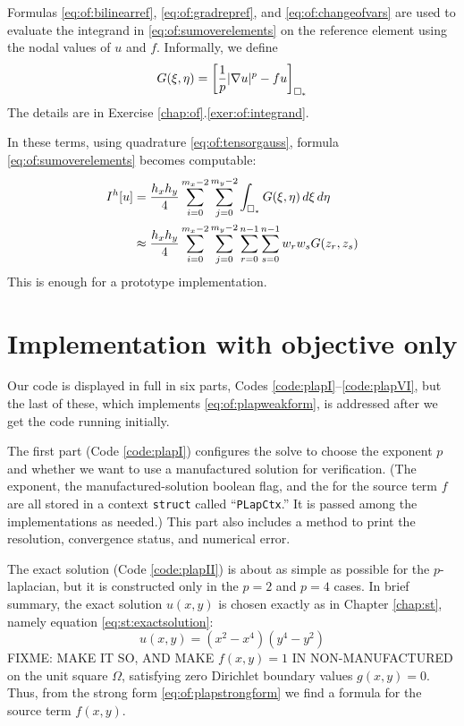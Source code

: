 \medskip

Formulas \eqref{eq:of:bilinearref}, \eqref{eq:of:gradrepref}, and \eqref{eq:of:changeofvars} are used to evaluate the integrand in \eqref{eq:of:sumoverelements} on the reference element using the nodal values of $u$ and $f$.  Informally, we define
\begin{equation}
G(\xi,\eta) = \left[\frac{1}{p} |\nabla u|^p - fu\right]_{\square_\ast}  \label{eq:of:integrandheuristic}
\end{equation}
The details are in Exercise \ref{chap:of}.\ref{exer:of:integrand}.

In these terms, using quadrature \eqref{eq:of:tensorgauss}, formula \eqref{eq:of:sumoverelements} becomes computable:
\begin{align}
I^h[u] &= \frac{h_x h_y}{4} \sum_{i=0}^{m_x-2} \sum_{j=0}^{m_y-2} \int_{\square_\ast} G(\xi,\eta) \,d\xi\,d\eta \notag \\
       &\approx \frac{h_x h_y}{4} \sum_{i=0}^{m_x-2} \sum_{j=0}^{m_y-2} \sum_{r=0}^{n-1} \sum_{s=0}^{n-1} w_r w_s G(z_r,z_s) \label{eq:of:quadraturesumoverelements}
\end{align}
This is enough for a prototype implementation.


\section{Implementation with objective only}

Our code is displayed in full in six parts, Codes \ref{code:plapI}--\ref{code:plapVI}, but the last of these, which implements \eqref{eq:of:plapweakform}, is addressed after we get the code running initially.

The first part (Code \ref{code:plapI}) configures the solve to choose the exponent $p$ and whether we want to use a manufactured solution for verification.  (The exponent, the manufactured-solution boolean flag, and the \pVec for the source term $f$ are all stored in a context \texttt{struct} called ``\texttt{PLapCtx}.''  It is passed among the implementations as needed.)  This part also includes a method to print the resolution, convergence status, and numerical error.

The exact solution (Code \ref{code:plapII}) is about as simple as possible for the $p$-laplacian, but it is constructed only in the $p=2$ and $p=4$ cases.  In brief summary, the exact solution $u(x,y)$ is chosen exactly as in Chapter \ref{chap:st}, namely equation \eqref{eq:st:exactsolution}:
\begin{equation}
    u(x,y) = (x^2 - x^4) (y^4 - y^2) \label{eq:of:exactsolution}
\end{equation}
FIXME: MAKE IT SO, AND MAKE $f(x,y)=1$ IN NON-MANUFACTURED on the unit square $\Omega$, satisfying zero Dirichlet boundary values $g(x,y)=0$.  Thus, from the strong form \eqref{eq:of:plapstrongform} we find a formula for the source term $f(x,y)$.


